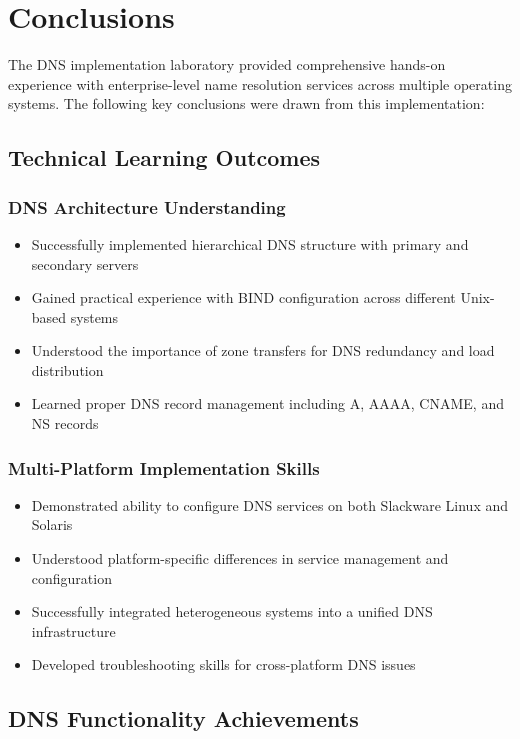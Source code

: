 \documentclass[12pt,a4paper]{article}
\begin{document}
\section{Conclusions}\label{sec:conclusions}

The DNS implementation laboratory provided comprehensive hands-on experience with enterprise-level name resolution services across multiple operating systems. The following key conclusions were drawn from this implementation:

\subsection{Technical Learning Outcomes}

\subsubsection{DNS Architecture Understanding}
\begin{itemize}
    \item Successfully implemented hierarchical DNS structure with primary and secondary servers
    \item Gained practical experience with BIND configuration across different Unix-based systems
    \item Understood the importance of zone transfers for DNS redundancy and load distribution
    \item Learned proper DNS record management including A, AAAA, CNAME, and NS records
\end{itemize}

\subsubsection{Multi-Platform Implementation Skills}
\begin{itemize}
    \item Demonstrated ability to configure DNS services on both Slackware Linux and Solaris
    \item Understood platform-specific differences in service management and configuration
    \item Successfully integrated heterogeneous systems into a unified DNS infrastructure
    \item Developed troubleshooting skills for cross-platform DNS issues
\end{itemize}

\subsection{DNS Functionality Achievements}
\end{document}
